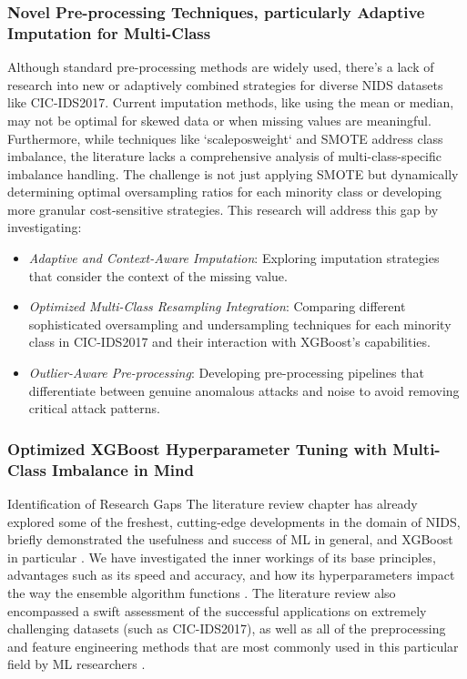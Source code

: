 \subsubsection{Novel Pre-processing Techniques, particularly Adaptive Imputation for Multi-Class}
Although standard pre-processing methods are widely used, there's a lack of research into new or adaptively combined strategies for diverse NIDS datasets like CIC-IDS2017. Current imputation methods, like using the mean or median, may not be optimal for skewed data or when missing values are meaningful. Furthermore, while techniques like `scale\textunderscore pos\textunderscore weight` and SMOTE address class imbalance, the literature lacks a comprehensive analysis of multi-class-specific imbalance handling. The challenge is not just applying SMOTE but dynamically determining optimal oversampling ratios for each minority class or developing more granular cost-sensitive strategies. This research will address this gap by investigating:
\begin{itemize}[noitemsep]
	\item \textit{Adaptive and Context-Aware Imputation}: Exploring imputation strategies that consider the context of the missing value.
	\item \textit{Optimized Multi-Class Resampling Integration}: Comparing different sophisticated oversampling and undersampling techniques for each minority class in CIC-IDS2017 and their interaction with XGBoost's capabilities.
	\item \textit{Outlier-Aware Pre-processing}: Developing pre-processing pipelines that differentiate between genuine anomalous attacks and noise to avoid removing critical attack patterns.
\end{itemize}

\subsubsection{Optimized XGBoost Hyperparameter Tuning with Multi-Class Imbalance in Mind}
Identification of Research Gaps 
The literature review chapter has already explored some of the freshest, cutting-edge developments in the domain of NIDS, briefly demonstrated the usefulness and success of ML in general, and XGBoost in particular \parencite{aldhubaib2024network}. We have investigated the inner workings of its base principles, advantages such as its speed and accuracy, and how its hyperparameters impact the way the ensemble algorithm functions \parencite{chen2016xgboost, habeeb2024two}. The literature review also encompassed a swift assessment of the successful applications on extremely challenging datasets (such as CIC-IDS2017), as well as all of the preprocessing and feature engineering methods that are most commonly used in this particular field by ML researchers \parencite{almutairi2025intrusion, kumar2021cicids}.

